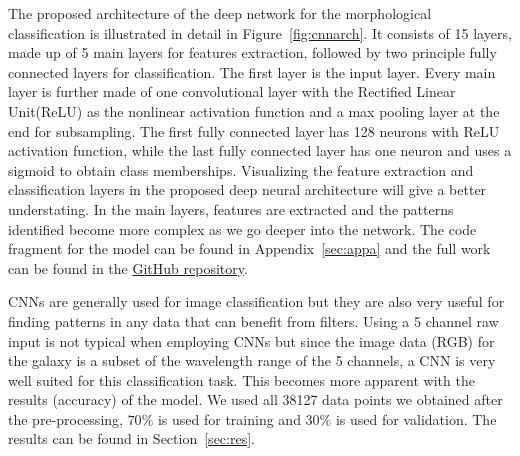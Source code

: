 The proposed architecture of the deep network for the morphological classification is illustrated in detail in Figure~\ref{fig:cnnarch}. It consists of 15 layers, made up of 5 main layers for features extraction, followed by two principle fully connected layers for classification. The first layer is the input layer. Every main layer is further made of one convolutional layer with the Rectified Linear Unit(ReLU) as the nonlinear activation function and a max pooling layer at the end for subsampling. The first fully connected layer has 128 neurons with ReLU activation function, while the last fully connected layer has one neuron and uses a sigmoid to obtain class memberships. Visualizing the feature extraction and classification layers in the proposed deep neural architecture will give a better understating. In the main layers, features are extracted and the patterns identified become more complex as we go deeper into the network. The code fragment for the model can be found in Appendix~\ref{sec:appa} and the full work can be found in the \href{https://github.com/klaykulik/galaxyCNN}{GitHub repository}.

CNNs are generally used for image classification but they are also very useful for finding patterns in any data that can benefit from filters. Using a 5 channel raw input is not typical when employing CNNs but since the image data (RGB) for the galaxy is a subset of the wavelength range of the 5 channels, a CNN is very well suited for this classification task. This becomes more apparent with the results (accuracy) of the model. We used all 38127 data points we obtained after the pre-processing, $70\%$ is used for training and $30\%$ is used for validation. The results can be found in Section~\ref{sec:res}.